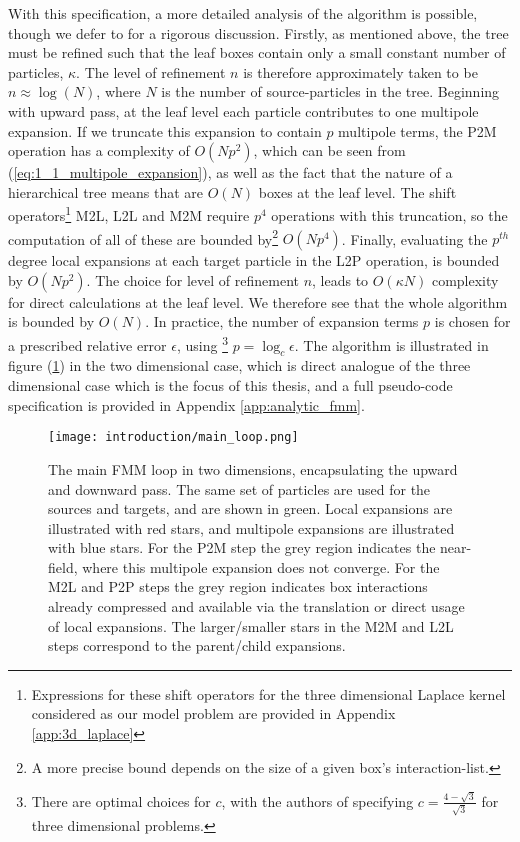 With this specification, a more detailed analysis of the algorithm is possible,
though we defer to \cite{Greengard:1987:Yale} for a rigorous discussion.
Firstly, as mentioned above, the tree must be refined such that the leaf boxes
contain only a small constant number of particles, $\kappa$. The level of refinement $n$
is therefore approximately taken to be $n \approx \log(N)$, where $N$ is the number
of \gls{source-particles} in the tree. Beginning with upward pass, at the leaf level each particle contributes to one
multipole expansion. If we truncate this expansion to contain $p$ multipole terms, the
\gls{P2M} operation has a complexity of $O(Np^2)$, which can be seen from
(\ref{eq:1_1_multipole_expansion}), as well as the fact that the nature of a
hierarchical tree means that are $O(N)$ boxes at the leaf level. The shift operators\footnote{
    Expressions for these shift operators for the three dimensional Laplace kernel
    considered as our model problem are provided in Appendix \ref{app:3d_laplace}
} \gls{M2L}, \gls{L2L} and \gls{M2M} require $p^4$ operations with this truncation,
so the computation of all of these are bounded by\footnote{A more precise
bound depends on the size of a given box's \gls{interaction-list}.} $O(Np^4)$. Finally,
evaluating the $p^{th}$ degree local expansions at each target particle in the
\gls{L2P} operation, is bounded by $O(Np^2)$. The choice for level of refinement
$n$, leads to $O(\kappa N)$ complexity for direct calculations at the
leaf level. We therefore see that the whole algorithm is bounded by $O(N)$.
In practice, the number of expansion terms $p$ is chosen for a prescribed relative error $\epsilon$, using
\footnote{There are optimal choices for $c$, with the authors of \cite{Ying:2004:JCP}
specifying $c=\frac{4-\sqrt{3}}{\sqrt{3}}$ for three dimensional problems.}
$p=\log_c \epsilon$. The algorithm is illustrated in figure (\ref{fig:1_1_main_loop})
in the two dimensional case, which is direct analogue of the three dimensional case
which is the focus of this thesis, and a full pseudo-code specification is
provided in Appendix \ref{app:analytic_fmm}.

\begin{figure}[!h]
    \centering
    {\texttt{[image: introduction/main\_loop.png]}}
  \caption{
      The main FMM loop in two dimensions, encapsulating the upward and downward
      pass. The same set of particles are used for the sources and targets, and
      are shown in green. Local expansions are illustrated with red stars, and
      multipole expansions are illustrated with blue stars. For the P2M step the
      grey region indicates the \gls{near-field}, where this multipole expansion
      does not converge. For the M2L and P2P steps the grey region indicates
      box interactions already compressed and available via the translation or
      direct usage of local expansions. The larger/smaller stars in the M2M and
      L2L steps correspond to the parent/child expansions.
  }
  \label{fig:1_1_main_loop}
\end{figure}

